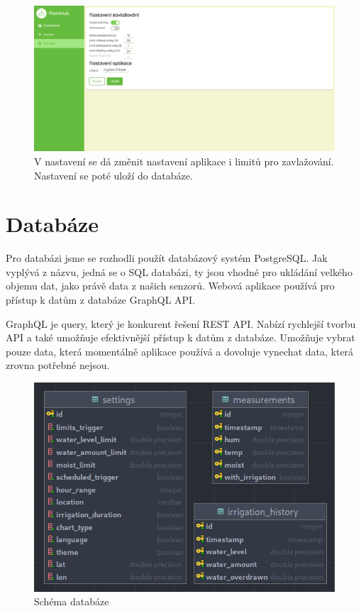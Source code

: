 \documentclass[12pt,a4paper]{article}
\begin{document}
\begin{figure}[h]
	\centering
	\includegraphics[width=\linewidth]{web-ui-settings.png}
	\caption{V nastavení se dá změnit nastavení aplikace i limitů pro
		zavlažování. Nastavení se poté uloží do databáze.}
\end{figure}

\clearpage

\section{Databáze}

Pro databázi jsme se rozhodli použít databázový systém PostgreSQL. Jak vyplývá
z názvu, jedná se o SQL databázi, ty jsou vhodné pro ukládání velkého objemu
dat, jako právě data z našich senzorů. Webová aplikace používá pro přístup k
datům z databáze GraphQL API.

GraphQL je query, který je konkurent řešení REST API. Nabízí rychlejší
tvorbu API a také umožňuje efektivnější přístup k datům z databáze. Umožňuje
vybrat pouze data, která momentálně aplikace používá a dovoluje vynechat data,
která zrovna potřebné nejsou.

\begin{figure}[h]
	\centering
	\includegraphics[width=0.9\linewidth]{db.png}
	\caption{Schéma databáze}
\end{figure}
\end{document}
